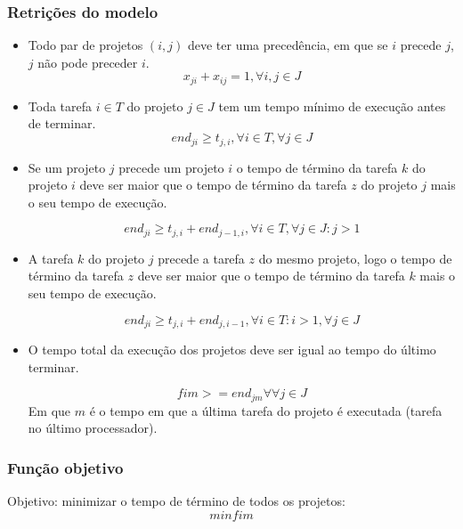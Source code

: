 \documentclass[11pt,letterpaper]{article}
\begin{document}
\subsubsection*{Retrições do modelo}
\begin{itemize}
\item Todo par de projetos $(i,j)$ deve ter uma precedência, em que se $i$
  precede $j$, $j$ não pode preceder $i$. 
\begin{equation*}
  x_{ji}+x_{ij}=1, \forall i,j \in J
\end{equation*}

\item Toda tarefa $i \in T$ do projeto  $j \in J$ tem um tempo mínimo de execução antes de terminar. 
\begin{equation*}
  end_{ji} \geq t_{j,i}, \forall i \in T, \forall j \in J
\end{equation*}

\item Se um projeto $j$ precede um projeto $i$ o tempo de término da
  tarefa $k$ do projeto $i$ deve ser maior que o tempo de término da
  tarefa $z$ do projeto $j$ mais o seu tempo de execução.
 
\begin{equation*}
  end_{ji} \geq t_{j,i}+ end_{j-1,i}, \forall i \in T, \forall j \in J
  : j>1 
\end{equation*}

\item A tarefa $k$ do projeto $j$ precede a tarefa $z$ do mesmo
  projeto, logo o tempo de término da
  tarefa $z$ deve ser maior que o tempo de término da
  tarefa $k$ mais o seu tempo de execução.
 
\begin{equation*}
  end_{ji} \geq t_{j,i}+ end_{j,i-1}, \forall i \in T: i>1 , \forall j \in J
\end{equation*}

\item O tempo total da execução dos projetos deve ser igual ao tempo
  do último terminar.
 
\begin{equation*}
 fim>= end_{jm} \forall \forall j \in J
\end{equation*}
Em que $m$ é o tempo em que a última tarefa do projeto é executada
(tarefa no último processador).
\end{itemize}


\subsubsection*{Função objetivo}
Objetivo: minimizar o tempo de término de todos os projetos:
\begin{equation}
min fim
\end{equation}
\end{document}
